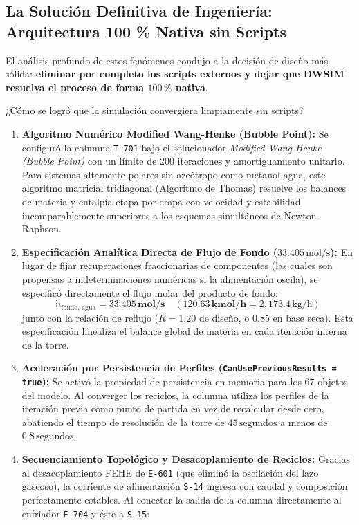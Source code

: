 \documentclass[11pt,a4paper]{article}
\begin{document}
\subsection{La Solución Definitiva de Ingeniería: Arquitectura 100 \% Nativa sin Scripts}
El análisis profundo de estos fenómenos condujo a la decisión de diseño más sólida: \textbf{eliminar por completo los scripts externos y dejar que DWSIM resuelva el proceso de forma $100\,\%$ nativa}.

¿Cómo se logró que la simulación convergiera limpiamente sin scripts?
\begin{enumerate}
    \item \textbf{Algoritmo Numérico Modified Wang-Henke (Bubble Point):} Se configuró la columna \texttt{T-701} bajo el solucionador \textit{Modified Wang-Henke (Bubble Point)} con un límite de 200 iteraciones y amortiguamiento unitario. Para sistemas altamente polares sin azeótropo como metanol-agua, este algoritmo matricial tridiagonal (Algoritmo de Thomas) resuelve los balances de materia y entalpía etapa por etapa con velocidad y estabilidad incomparablemente superiores a los esquemas simultáneos de Newton-Raphson.
    \item \textbf{Especificación Analítica Directa de Flujo de Fondo ($33.405\,\text{mol/s}$):} En lugar de fijar recuperaciones fraccionarias de componentes (las cuales son propensas a indeterminaciones numéricas si la alimentación oscila), se especificó directamente el flujo molar del producto de fondo:
    \begin{equation*}
        \dot{n}_{\text{fondo, agua}} = \mathbf{33.405\,\text{mol/s}} \quad (\mathbf{120.63\,\text{kmol/h}} = 2{,}173.4\,\text{kg/h})
    \end{equation*}
    junto con la relación de reflujo ($R = 1.20$ de diseño, o $0.85$ en base seca). Esta especificación linealiza el balance global de materia en cada iteración interna de la torre.
    \item \textbf{Aceleración por Persistencia de Perfiles (\texttt{CanUsePreviousResults = true}):} Se activó la propiedad de persistencia en memoria para los 67 objetos del modelo. Al converger los reciclos, la columna utiliza los perfiles de la iteración previa como punto de partida en vez de recalcular desde cero, abatiendo el tiempo de resolución de la torre de $45\,\text{segundos}$ a menos de $0.8\,\text{segundos}$.
    \item \textbf{Secuenciamiento Topológico y Desacoplamiento de Reciclos:} Gracias al desacoplamiento FEHE de \texttt{E-601} (que eliminó la oscilación del lazo gaseoso), la corriente de alimentación \texttt{S-14} ingresa con caudal y composición perfectamente estables. Al conectar la salida de la columna directamente al enfriador \texttt{E-704} y éste a \texttt{S-15}:

\end{enumerate}
\end{document}
